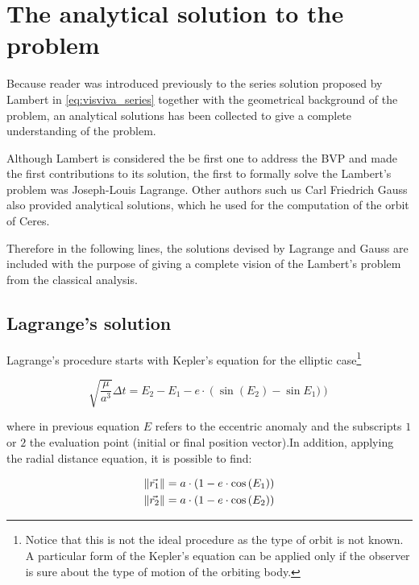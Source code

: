 \section{The analytical solution to the problem}

Because reader was introduced previously to the series solution proposed by
Lambert in \ref{eq:visviva_series} together with the geometrical background of
the problem, an analytical solutions has been collected to give a complete
understanding of the problem.

Although Lambert is considered the be first one to address the BVP and made the
first contributions to its solution, the first to formally solve the Lambert's
problem was Joseph-Louis Lagrange. Other authors such us Carl Friedrich Gauss
also provided analytical solutions, which he used for the computation of the
orbit of Ceres.

Therefore in the following lines, the solutions devised by Lagrange and Gauss
are included with the purpose of giving a complete vision of the Lambert's
problem from the classical analysis.

\subsection{Lagrange's solution}

Lagrange's procedure starts with Kepler's equation for the elliptic
case\footnote{Notice that this is not the ideal procedure as the type of orbit
  is not known. A particular form of the Kepler's equation can be applied
  only if the observer is sure about the type of motion of the orbiting
  body.}

\begin{equation}
  \sqrt{\frac{\mu}{a^3}} \Delta t = E_{2} - E_{1} - e \cdot \left(\sin{(E_{2}) -\sin{E_{1}}}) \right)
  \label{eq:kepler_lagrange}
\end{equation}

where in previous equation $E$ refers to the eccentric anomaly and the
subscripts $1$ or $2$ the evaluation point (initial or final position vector).In
addition, applying the radial distance equation, it is possible to find:

\begin{align}
  \lVert\vec{r_{1}}\rVert & = a \cdot (1 - e \cdot \cos{(E_1)}) \\
  \lVert\vec{r_{2}}\rVert & = a \cdot (1 - e \cdot \cos{(E_2)}) \\
  \label{eq:radial_distances_lagrage}
\end{align}

